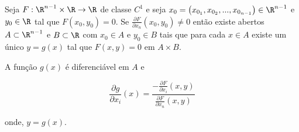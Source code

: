 \documentclass[11pt, oneside, a4paper]{gsm-l}
\begin{document}
\begin{teo}
    Seja $F:\R^{n - 1}  \times \R \to \R$ de classe $C^1$ e seja $x_0  = \left( {x_{0_1 } ,x_{0_2 } ,...,x_{0_{n - 1} } } \right) \in \R^{n - 1}$ e $y_0 \in \R$ tal que $F\left( {x_0 ,y_0 } \right) = 0$. Se $\frac{{\partial F}}{{\partial x_n }}\left( {x_0 ,y_0 } \right) \ne 0$ então existe abertos $A \subset \R^{n - 1}$ e $B \subset \R$ com $x_0 \in A$ e $y_0 \in B$ tais que para cada $x \in A$ existe um \'unico $y = g(x)$ tal que $F\left( {x,y} \right) = 0$ em $A \times B$.

A função $g(x)$ é diferenciável em $A$ e

\[\displaystyle
\frac{{\partial g}}{{\partial x_i }}\left( x \right) = \displaystyle \frac{{\displaystyle - \frac{{\partial F}}{{\partial x_i }}\left( {x,y} \right)}}
{{\displaystyle \frac{{\partial F}}{{\partial x_n }}\left( {x,y} \right)}}
\]

onde, $y = g\left( x \right)$.
\end{teo}
\end{document}
